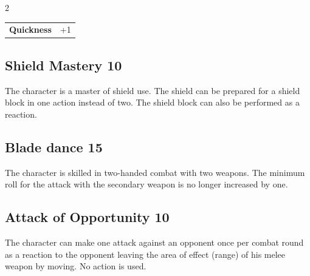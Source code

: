 \begin{multicols}{2}
\begin{tcolorbox}
\begin{tabular}{@{}ll@{}}
    \textbf{Quickness} & +1\\
\end{tabular}


\end{tcolorbox}

\begin{tcolorbox}
    \subsection*{Shield Mastery \hfill \small{10 }}
    \tcblower
The character is a master of shield use. The shield can be prepared for a shield block in one action instead of two. The shield block can also be performed as a reaction.


\vspace{3mm}



\end{tcolorbox}

\begin{tcolorbox}
    \subsection*{Blade dance \hfill \small{15 }}
    \tcblower
The character is skilled in two-handed combat with two weapons. The minimum roll for the attack with the secondary weapon is no longer increased by one.


\vspace{3mm}



\end{tcolorbox}

\begin{tcolorbox}
    \subsection*{Attack of Opportunity \hfill \small{10 }}
    \tcblower
The character can make one attack against an opponent once per combat round as a reaction to the opponent leaving the area of effect (range) of his melee weapon by moving. No action is used.



\end{tcolorbox}
\end{multicols}
